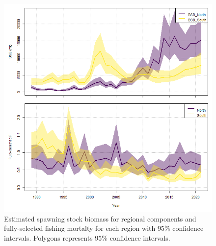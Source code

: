 \documentclass[
]{article}
\begin{document}
\begin{figure}

{\centering \includegraphics[width=1\linewidth]{../2023.RT.Runs/Run34/plots_png/results/SSB_F_trend} 

}

\caption{Estimated spawning stock biomass for regional components and fully-selected fishing mortalty for each region with 95\% confidence intervals. Polygons represents 95\% confidence intervals.}\label{fig:SSB-F}
\end{figure}
\clearpage
\end{document}
